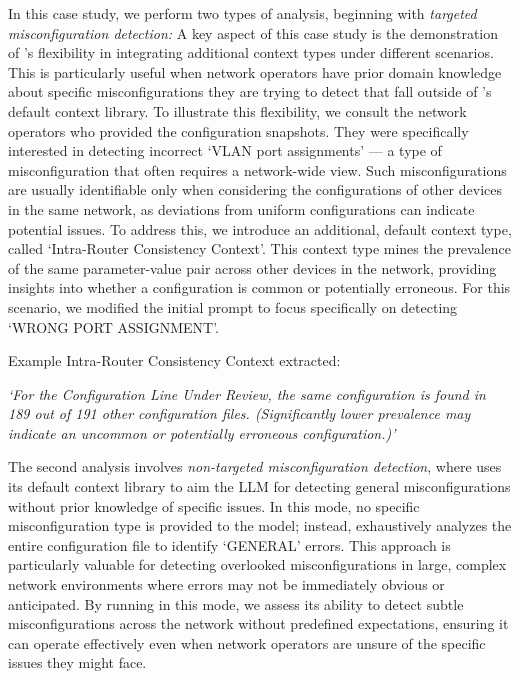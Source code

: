 In this case study, we perform two types of analysis, beginning with \textit{targeted misconfiguration detection:} A key aspect of this case study is the demonstration of \sysname{}'s flexibility in integrating additional context types under different scenarios. This is particularly useful when network operators have prior domain knowledge about specific misconfigurations they are trying to detect that fall outside of \sysname{}'s default context library.
To illustrate this flexibility, we consult the network operators who provided the configuration snapshots. They were specifically interested in detecting incorrect `VLAN port assignments' --- a type of misconfiguration that often requires a network-wide view. Such misconfigurations are usually identifiable only when considering the configurations of other devices in the same network, as deviations from uniform configurations can indicate potential issues.
To address this, we introduce an additional, default context type, called `Intra-Router Consistency Context'.  This context type mines  the prevalence of the same parameter-value pair across other devices in the network, providing insights into whether a configuration is common or potentially erroneous. For this scenario, we modified the initial prompt to focus specifically on detecting `WRONG PORT ASSIGNMENT'.

Example Intra-Router Consistency Context extracted:

\textit{`For the Configuration Line Under Review, the same configuration is found in 189 out of 191 other configuration files. (Significantly lower prevalence may indicate an uncommon or potentially erroneous configuration.)'}

The second analysis involves \textit{non-targeted misconfiguration detection}, where \sysname{} uses its default context library to aim the LLM for detecting general misconfigurations without prior knowledge of specific issues. In this mode, no specific misconfiguration type is provided to the model; instead, \sysname{} exhaustively analyzes the entire configuration file to identify `GENERAL' errors. 
This approach is particularly valuable for detecting overlooked misconfigurations in large, complex network environments where errors may not be immediately obvious or anticipated. By running \sysname{} in this mode, we assess its ability to detect subtle misconfigurations across the network without predefined expectations, ensuring it can operate effectively even when network operators are unsure of the specific issues they might face.

